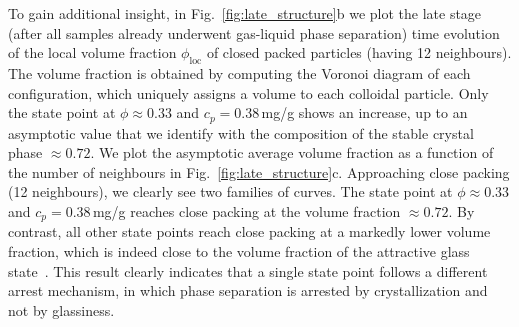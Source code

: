 \documentclass[preprint,amsmath,amssymb,superscriptaddress]{revtex4-1}
\begin{document}
To gain additional insight, in Fig.~\ref{fig:late_structure}b we plot the late stage (after all samples already underwent gas-liquid phase separation) time evolution of the local volume fraction $\phi_\mathrm{loc}$ of closed packed particles (having 12 neighbours). The volume fraction is obtained by computing the Voronoi diagram of each configuration, which uniquely assigns a volume to each colloidal particle. Only the state point at $\phi\approx 0.33$ and $c_p = 0.38\,$mg/g shows an increase, up to an asymptotic value that we identify with the composition of the stable crystal phase $\approx 0.72$. We plot the asymptotic average volume fraction as a function of the number of neighbours in Fig.~\ref{fig:late_structure}c. Approaching close packing (12 neighbours), we clearly see two families of curves. The state point at $\phi\approx 0.33$ and $c_p=0.38\,$mg/g reaches close packing at the volume fraction $\approx 0.72$. By contrast, all other state points reach close packing at a markedly 
lower volume fraction, which is indeed close to the volume fraction of the attractive glass state~\cite{pham2002multiple}. This result clearly indicates that a single state point follows a different arrest mechanism, in which phase separation is arrested by crystallization and not by glassiness.


\end{document}
